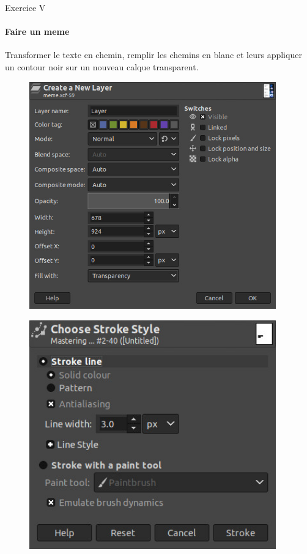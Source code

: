\documentclass[10pt,svgnames,usenames,table]{beamer}
\begin{document}
\begin{frame}{Exercice V}
\framesubtitle{Faire un meme}
	Transformer le texte en chemin, remplir les chemins en blanc et leurs appliquer un contour noir sur un nouveau calque transparent.
	\hfill
	\begin{minipage}{.50\textwidth}
	\begin{figure}
		\centering
		\includegraphics[width=0.95\textwidth]{Images/text/new_layer}
	\end{figure}
	\end{minipage}\hfill
	\begin{minipage}{0.50\textwidth}
	\begin{figure}
		\centering
		\includegraphics[width=0.95\textwidth]{Images/text/stroke_style}
	\end{figure}
	\end{minipage}

\end{frame}
\end{document}
